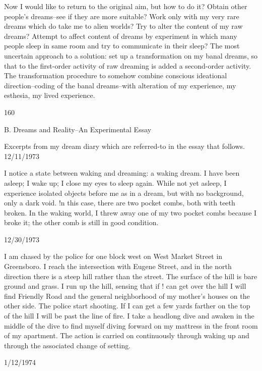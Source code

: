 \documentclass[10pt,twoside]{memoir}
\begin{document}
\begin{enumerate}
{\begin{enumerate}
\begin{sysrules}
\begin{sysrules}
\begin{sysrules}
\begin{sysrules}
{\begin{enumerate}
{{{{{{Now I would like to return to the original aim, but how to do it? Obtain 
other people's dreams--see if they are more suitable? Work only with my 
very rare dreams which do take me to alien worlds? Try to alter the content 
of my raw dreams? Attempt to affect content of dreams by experiment in 
which many people sleep in same room and try to communicate in their 
sleep? The most uncertain approach to a solution: set up a transformation 
on my banal dreams, so that to the first-order activity of raw dreaming is 
added a second-order activity. The transformation procedure to somehow 
combine conscious ideational direction--coding of the banal dreams--with 
alteration of my experience, my esthesia, my lived experience. 


160 


B. Dreams and Reality--An Experimental Essay 


Excerpts from my dream diary which are referred-to in the essay that 
follows. 
12/11/1973 

I notice a state between waking and dreaming: a waking dream. I have 
been asleep; I wake up; I close my eyes to sleep again. While not yet asleep, I 
experience isolated objects before me as in a dream, but with no 
background, only a dark void. !n this case, there are two pocket combs, both 
with teeth broken. In the waking world, I threw away one of my two pocket 
combs because I broke it; the other comb is still in good condition. 


12/30/1973 

I am chased by the police for one block west on West Market Street in 
Greensboro. I reach the intersection with Eugene Street, and in the north 
direction there is a steep hill rather than the street. The surface of the hill is 
bare ground and grass. I run up the hill, sensing that if ! can get over the hill 
I will find Friendly Road and the general neighborhood of my mother's 
houses on the other side. The police start shooting. If I can get a few yards 
farther on the top of the hill I will be past the line of fire. I take a headlong 
dive and awaken in the middle of the dive to find myself diving forward on 
my mattress in the front room of my apartment. The action is carried on 
continuously through waking up and through the associated change of 
setting. 


1/12/1974 

}}}}}}
\end{enumerate}}
\end{sysrules}
\end{sysrules}
\end{sysrules}
\end{sysrules}
\end{enumerate}}
\end{enumerate}
\end{document}

